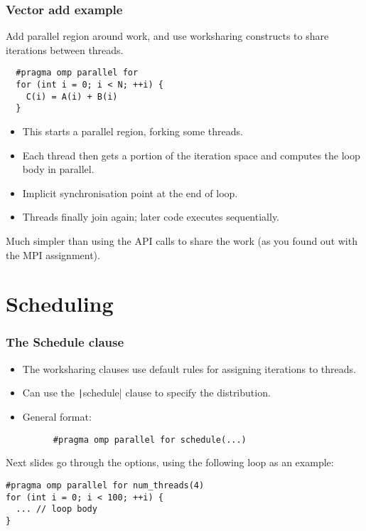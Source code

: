 \documentclass{beamer}
\begin{document}
\begin{frame}[fragile]
\frametitle{Vector add example}
Add parallel region around work, and use worksharing constructs to share iterations between threads.
\begin{verbatim}
  #pragma omp parallel for
  for (int i = 0; i < N; ++i) {
    C(i) = A(i) + B(i)
  }
\end{verbatim}
\begin{itemize}
  \item This starts a parallel region, forking some threads.
  \item Each thread then gets a portion of the iteration space and computes the loop body in parallel.
  \item Implicit synchronisation point at the end of loop.
  \item Threads finally join again; later code executes sequentially.
\end{itemize}

Much simpler than using the API calls to share the work (as you found out with the MPI assignment).
\end{frame}

\section{Scheduling}
\begin{frame}[fragile]
\frametitle{The Schedule clause}
\begin{itemize}
  \item The worksharing clauses use default rules for assigning iterations to threads.
  \item Can use the \texttt|schedule| clause to specify the distribution.
  \item General format:
    \begin{verbatim}
      #pragma omp parallel for schedule(...)
    \end{verbatim}
\end{itemize}
Next slides go through the options, using the following loop as an example:
\begin{verbatim}
#pragma omp parallel for num_threads(4)
for (int i = 0; i < 100; ++i) {
  ... // loop body
}
\end{verbatim}

\end{frame}
\end{document}
